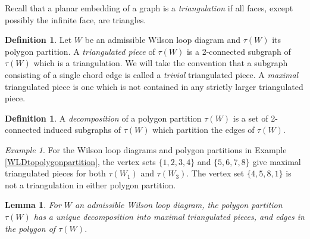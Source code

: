 \documentclass[11pt]{article}
\newtheorem{lem}[thm]{Lemma}
\theoremstyle{remark}
\newtheorem{eg}[thm]{Example}
\theoremstyle{definition}
\newtheorem{dfn}[thm]{Definition}
\begin{document}
Recall that a planar embedding of a graph is a \emph{triangulation} if all faces, except possibly the infinite face, are triangles.

\begin{dfn}
  Let $W$ be an admissible Wilson loop diagram and $\tau(W)$ its polygon partition. A \emph{triangulated piece} of $\tau(W)$ is a 2-connected subgraph of $\tau(W)$ which is a triangulation. We will take the convention that a subgraph consisting of a single chord edge is called a \emph{trivial} triangulated piece.
A {\em maximal} triangulated piece is one which is not contained in any strictly larger triangulated piece.
\end{dfn}

\begin{dfn}
 A {\em decomposition} of a polygon partition $\tau(W)$ is a set of 2-connected induced subgraphs of $\tau(W)$ which partition the edges of $\tau(W)$.  
\end{dfn}

\begin{eg} \label{eg: unique decomposition} For the Wilson loop diagrams and polygon partitions in Example \ref{WLDtopolygonpartition}, the vertex sets $\{1, 2, 3,4\}$ and $\{5, 6, 7, 8\}$ give maximal triangulated pieces for both $\tau(W_1)$ and $\tau(W_3)$. The vertex set $\{4,5, 8, 1\}$ is not a triangulation in either polygon partition. 
\end{eg}

\begin{lem} \label{decompositionlem}
  For $W$ an admissible Wilson loop diagram, the polygon partition $\tau(W)$ has a unique decomposition into maximal triangulated pieces, and edges in the polygon of $\tau(W)$.
\end{lem}
\end{document}

